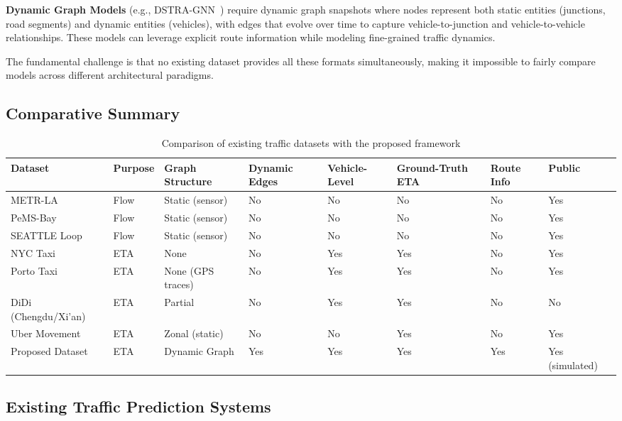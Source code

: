 \textbf{Dynamic Graph Models} (e.g., DSTRA-GNN~\cite{Tordjman2025}) require dynamic graph snapshots where nodes represent both static entities (junctions, road segments) and dynamic entities (vehicles), with edges that evolve over time to capture vehicle-to-junction and vehicle-to-vehicle relationships. These models can leverage explicit route information while modeling fine-grained traffic dynamics.

The fundamental challenge is that no existing dataset provides all these formats simultaneously, making it impossible to fairly compare models across different architectural paradigms.

\subsection{Comparative Summary}

\begin{table}[h]
\centering
\begin{tabular}{|l|l|l|l|l|l|l|l|}
\hline
\textbf{Dataset} & \textbf{Purpose} & \textbf{Graph Structure} & \textbf{Dynamic Edges} & \textbf{Vehicle-Level} & \textbf{Ground-Truth ETA} & \textbf{Route Info} & \textbf{Public} \\
\hline
METR-LA & Flow & Static (sensor) & No & No & No & No & Yes \\
\hline
PeMS-Bay & Flow & Static (sensor) & No & No & No & No & Yes \\
\hline
SEATTLE Loop & Flow & Static (sensor) & No & No & No & No & Yes \\
\hline
NYC Taxi & ETA & None & No & Yes & Yes & No & Yes \\
\hline
Porto Taxi & ETA & None (GPS traces) & No & Yes & Yes & No & Yes \\
\hline
DiDi (Chengdu/Xi'an) & ETA & Partial & No & Yes & Yes & No & No \\
\hline
Uber Movement & ETA & Zonal (static) & No & No & Yes & No & Yes \\
\hline
Proposed Dataset & ETA & Dynamic Graph & Yes & Yes & Yes & Yes & Yes (simulated) \\
\hline
\end{tabular}
\caption{Comparison of existing traffic datasets with the proposed framework}
\label{tab:dataset_comparison}
\end{table}

\subsection{Existing Traffic Prediction Systems}

